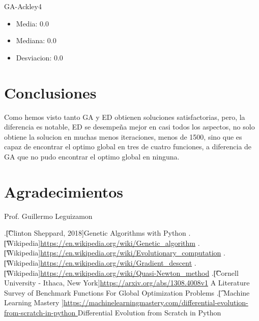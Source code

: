 \documentclass[10pt]{article}
\begin{document}
GA-Ackley4
\begin{itemize}
\item
Media:  0.0 
\item%
Mediana:  0.0 
\item%
Desviacion:  0.0
\end{itemize}

\section{Conclusiones}
Como hemos visto tanto GA y ED obtienen soluciones satisfactorias, pero, la diferencia es notable, ED se desempeña mejor en casi todos los aspectos, no solo obtiene la solucion en muchas menos iteraciones, menos de 1500, sino que es capaz de encontrar el optimo global en tres de cuatro funciones, a diferencia de GA que no pudo encontrar el optimo global en ninguna.
\section*{Agradecimientos}
Prof. Guillermo Leguizamon


\begin{thebibliography}{99} %
.\t[Clinton Sheppard, 2018]{}Genetic Algorithms with Python
.\t[Wikipedia]{}\url{https://en.wikipedia.org/wiki/Genetic_algorithm}
.\t[Wikipedia]{}\url{https://en.wikipedia.org/wiki/Evolutionary_computation}
.\t[Wikipedia]{}\url{https://en.wikipedia.org/wiki/Gradient_descent}
.\t[Wikipedia]{}\url{https://en.wikipedia.org/wiki/Quasi-Newton_method}
.\t[Cornell University - Ithaca, New York]{}\url{https://arxiv.org/abs/1308.4008v1} A Literature Survey of Benchmark Functions For Global Optimization Problems
.\t[ Machine Learning Mastery ]{}\url{https://machinelearningmastery.com/differential-evolution-from-scratch-in-python } Differential Evolution from Scratch in Python


\end{thebibliography} 
\end{document}
